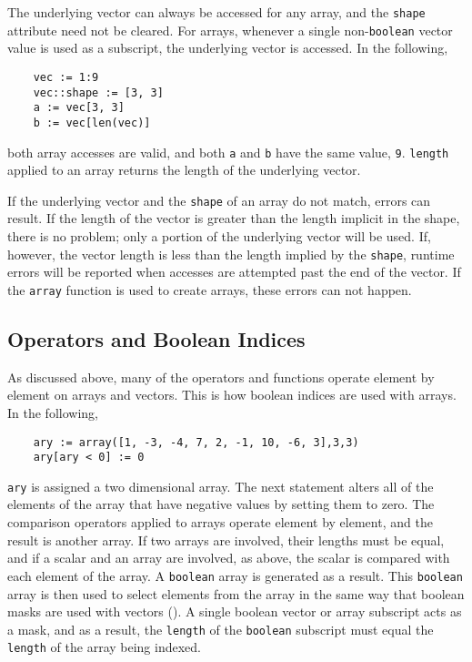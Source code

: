 The underlying vector can always be accessed for any array, and the 
{\tt shape} attribute need not be cleared. For arrays, whenever a single
non-{\tt boolean} vector value is used as a subscript, the underlying vector
is accessed. In the following,
\begin{verbatim}
    vec := 1:9
    vec::shape := [3, 3]
    a := vec[3, 3]
    b := vec[len(vec)]
\end{verbatim}
both array accesses are valid, and both {\tt a} and {\tt b}  have the
same value, {\tt 9}.  {\tt length}  applied to an array returns the 
length of the underlying vector. 

If 
the underlying vector and the {\tt shape} of an array  do not match,
errors can result. If the length of the vector is greater than the
length implicit in the shape, there is no problem; only a portion
of the underlying vector will be used. If, however, the vector length
is less than the length implied by the {\tt shape}, runtime errors will
be reported when accesses are attempted past the end of the vector.
If the {\tt array} function is used to create arrays, these errors can
not happen.

\subsection{Operators and Boolean Indices}
\label{indexing-array-boolean-indices}

As discussed above, many of the operators and functions operate 
element by element on arrays and vectors. This is how boolean
indices are used with arrays. In the following,
\begin{verbatim}
    ary := array([1, -3, -4, 7, 2, -1, 10, -6, 3],3,3)
    ary[ary < 0] := 0
\end{verbatim}
{\tt ary} is assigned a two dimensional array. The next statement
alters all of the elements of the array that  have negative
values by setting them to zero. The comparison operators applied to
arrays operate element by element, and the result is another array.
If two arrays are involved, their lengths must be equal, and if a
scalar and an array are involved, as above, the scalar is compared
with each element of the array. A {\tt boolean} array is generated as 
a result. This {\tt boolean} array is then used to select elements from
the array in the same way that boolean masks are used with vectors
(). A 
single boolean vector or array subscript acts as a mask, and as a result,
the {\tt length} of the {\tt boolean} subscript must equal the {\tt length} 
of the array being indexed.

